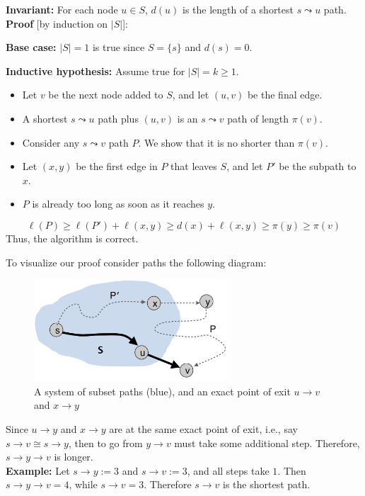 \begin{Proof}

    \textbf{Invariant:} For each node $u \in S$, $d(u)$ is the length of a shortest $s \leadsto u$ path.\\
    \textbf{Proof} [by induction on $|S|$]:
    
    \textbf{Base case:} $|S| = 1$ is true since $S = \{s\}$ and $d(s) = 0$.
    
    \textbf{Inductive hypothesis:} Assume true for $|S| = k \geq 1$.
    \begin{itemize}
        \item Let $v$ be the next node added to $S$, and let $(u, v)$ be the final edge.
        \item A shortest $s \leadsto u$ path plus $(u, v)$ is an $s \leadsto v$ path of length $\pi(v)$.
        \item Consider any $s \leadsto v$ path $P$. We show that it is no shorter than $\pi(v)$.
        \item Let $(x, y)$ be the first edge in $P$ that leaves $S$, and let $P'$ be the subpath to $x$.
        \item $P$ is already too long as soon as it reaches $y$.
    \end{itemize}
    \[
    \ell(P) \geq \ell(P') + \ell(x, y) \geq d(x) + \ell(x, y) \geq \pi(y) \geq \pi(v)
    \]
    \noindent
    Thus, the algorithm is correct.
    \end{Proof}
    
\newpage

\noindent
To visualize our proof consider paths the following diagram:
\begin{figure}[h]
    \begin{center}
      \includegraphics[height=1.5in]{./Sections/sched/dstra/dstra_proof.png}
    \end{center}
     \caption{A system of subset paths (blue), and an exact point of exit $u\to v$ and $x\to y$}\label{fig:dstra_proof}
\end{figure}

\noindent
Since $u\to y$ and $x\to y$ are at the same exact point of exit, i.e., say $s\to v\cong s\to y$, then to go from $y\to v$ must take some additional step.
Therefore, $s\to y\to v$ is longer.\\
\textbf{Example:} Let $s\to y:= 3$ and $s\to v:= 3$, and all steps take $1$.
Then $s\to y\to v = 4$, while $s\to v = 3$. Therefore $s\to v$ is the shortest path.

